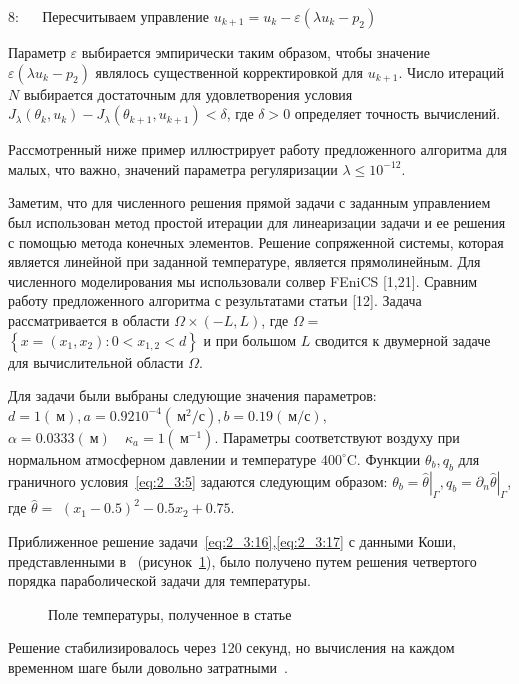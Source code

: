 8: $\quad$ Пересчитываем управление
$u_{k+1}=u_{k}-\varepsilon\left(\lambda u_{k}-p_{2}\right)$

Параметр $\varepsilon$ выбирается эмпирически таким образом, чтобы
значение $\varepsilon\left(\lambda u_{k}-p_{2}\right)$ являлось
существенной корректировкой для $u_{k+1}$.
Число итераций $N$ выбирается достаточным для
удовлетворения условия $J_{\lambda}\left(\theta_{k}, u_{k}\right)
-J_{\lambda}\left(\theta_{k+1}, u_{k+1}\right)<\delta$, где $\delta>0$
определяет точность вычислений.

Рассмотренный ниже пример иллюстрирует работу предложенного
алгоритма для малых, что важно, значений параметра регуляризации
$\lambda \leq 10^{-12}$.


Заметим, что для численного решения прямой задачи с заданным управлением
был использован метод простой итерации для линеаризации задачи и ее решения
с помощью метода конечных элементов.
Решение сопряженной системы, которая является линейной
при заданной температуре, является прямолинейным.
Для численного моделирования мы использовали солвер FEniCS [1,21].
Сравним работу предложенного
алгоритма с результатами статьи [12].
Задача рассматривается в области $\Omega \times(-L, L)$,
где $\Omega=$ $\left\{x=\left(x_{1}, x_{2}\right): 0<x_{1,2}<d\right\}$
и при большом $L$ сводится к двумерной задаче для вычислительной
области $\Omega$.

Для задачи были выбраны следующие значения параметров:
$d=1(\mathrm{~м}), a=0.9210^{-4}\left(\mathrm{~м}^{2} / \mathrm{с}\right),
b=0.19(\mathrm{~м} / \mathrm{с})$, $\alpha=0.0333(\mathrm{~м})
\quad \kappa_{a}=1\left(\mathrm{~м}^{-1}\right)$.
Параметры соответствуют воздуху при нормальном атмосферном давлении
и температуре $400^{\circ} \mathrm{C}$.
Функции $\theta_{b}, q_{b}$ для граничного условия~\eqref{eq:2_3:5}
задаются следующим образом: $\theta_{b}=\left.\widehat{\theta}\right|_{\Gamma},
q_{b}=\left.\partial_{n} \widehat{\theta}\right|_{\Gamma}$,
где $\widehat{\theta}=$ $\left(x_{1}-0.5\right)^{2}-0.5 x_{2}+0.75$.

Приближенное решение задачи~\eqref{eq:2_3:16},\eqref{eq:2_3:17}
с данными Коши, представленными в~\cite{Chebotarev2019Problem}
(рисунок~\ref{fig:2_3:1}), было получено путем решения четвертого порядка
параболической задачи для температуры.

\begin{figure}[ht]
    \label{fig:2_3:1}
    \caption{Поле температуры, полученное в статье~\cite{Chebotarev2019Problem}}
\end{figure}
Решение стабилизировалось через 120 секунд, но
вычисления на каждом временном шаге были
довольно затратными~\cite{Chebotarev2019Problem}.


